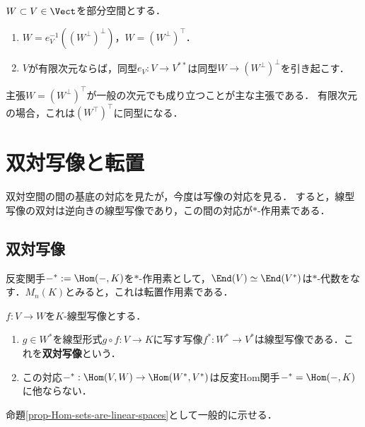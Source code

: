 \documentclass[uplatex, dvipdfmx]{jsreport}
\begin{document}
\begin{corollary}\label{cor-biannihilator-subspace}
    $W\subset V\in\Vect$を部分空間とする．
    \begin{enumerate}
        \item $W=e_V^{-1}((W^\bot)^\bot)$，$W=(W^\bot)^\top$．
        \item $V$が有限次元ならば，同型$e_V:V\to V^{**}$は同型$W\to(W^\bot)^\bot$を引き起こす．
    \end{enumerate}
\end{corollary}
\begin{remarks}
    主張$W=(W^\perp)^\top$が一般の次元でも成り立つことが主な主張である．
    有限次元の場合，これは$(W^\top)^\top$に同型になる．
\end{remarks}

\section{双対写像と転置}

\begin{tcolorbox}[colframe=ForestGreen, colback=ForestGreen!10!white,breakable,colbacktitle=ForestGreen!40!white,coltitle=black,fonttitle=\bfseries\sffamily,
title=]
    双対空間の間の基底の対応を見たが，今度は写像の対応を見る．
    すると，線型写像の双対は逆向きの線型写像であり，この間の対応が$*$-作用素である．
\end{tcolorbox}

\subsection{双対写像}

\begin{tcolorbox}[colframe=ForestGreen, colback=ForestGreen!10!white,breakable,colbacktitle=ForestGreen!40!white,coltitle=black,fonttitle=\bfseries\sffamily,
title=]
    反変関手$-^*:=\Hom(-,K)$を$*$-作用素として，$\End(V)\simeq\End(V^*)$は$*$-代数をなす．$M_n(K)$とみると，これは転置作用素である．
\end{tcolorbox}

\begin{proposition}
    $f:V\to W$を$K$-線型写像とする．
    \begin{enumerate}
        \item $g\in W^*$を線型形式$g\circ f:V\to K$に写す写像$f^*:W^*\to V^*$は線型写像である．これを\textbf{双対写像}という．
        \item この対応$-^*:\Hom(V,W)\to\Hom(W^*,V^*)$は反変Hom関手$-^*=\Hom(-,K)$に他ならない．
    \end{enumerate}
\end{proposition}
\begin{Proof}
    命題\ref{prop-Hom-sets-are-linear-spaces}として一般的に示せる．
\end{Proof}
\end{document}
